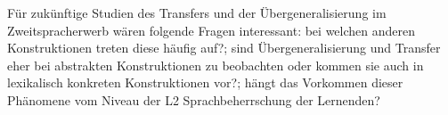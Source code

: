 Für zukünftige Studien des Transfers und der Übergeneralisierung im Zweitspracherwerb wären folgende Fragen interessant:
bei welchen anderen Konstruktionen treten diese häufig auf?;
sind Übergeneralisierung und Transfer eher bei abstrakten Konstruktionen zu beobachten oder kommen sie auch in lexikalisch konkreten Konstruktionen vor?;
hängt das Vorkommen dieser Phänomene vom Niveau der L2 Sprachbeherrschung der Lernenden?










